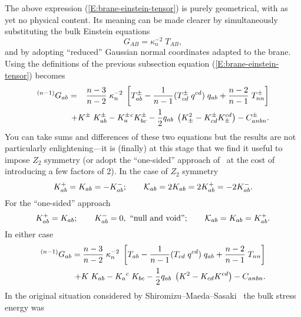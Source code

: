 \documentclass[a4paper,10pt]{article}
\begin{document}
{The above expression (\ref{E:brane-einstein-tensor}) is purely geometrical,
with as yet no physical content. Its meaning can be made clearer by
simultaneously substituting the bulk Einstein equations
%
\begin{equation}
G_{AB} = \kappa_n^{-2} \; T_{AB},
\end{equation}
%
and by adopting ``reduced'' Gaussian normal coordinates adapted to the
brane.  Using the definitions of the previous subsection equation
(\ref{E:brane-einstein-tensor}) becomes
% 
\begin{eqnarray}
{}^{(n-1)}G_{ab}=
&&\hspace{-6mm}
{n-3\over n-2}\; \kappa_n^{-2} \; \left[
T_{ab}^\pm - {1\over n-1} (T_{cd}^\pm \; q^{cd}) \; q_{ab} 
+ {n-2\over n-1} \; T_{nn}^\pm
\right]
\nonumber \\
&&\hspace{-6mm}
+K^\pm \; K_{ab}^\pm-K^\pm_{a}{}^{c} K^\pm_{bc} - {1 \over 2}  
q_{ab}\; \left( K_\pm^2- K^\pm_{cd} K_\pm^{cd}\right) - C^\pm_{anbn}.
\label{E:brane-einstein-tensor-2}
\end{eqnarray}
% 
You can take sums and differences of these two equations but the
results are not particularly enlightening---it is (finally) at this
stage that we find it useful to impose $Z_2$ symmetry (or adopt the
``one-sided'' approach of~\cite{void,edge} at the cost of introducing
a few factors of 2). In the case of $Z_2$ symmetry
%
\begin{equation}
K^+_{ab} = K_{ab} = - K^-_{ab}; \qquad {\mathcal K}_{ab} = 2 K_{ab} = 2 K^+_{ab} = -2 K^-_{ab}.
\end{equation}
%
For the ``one-sided'' approach~\cite{void,edge}
%
\begin{equation}
K^+_{ab} =  K_{ab}; \qquad 
K^-_{ab} = 0, \hbox{ ``null and void''}; \qquad 
{\mathcal K}_{ab} = K_{ab} = K^+_{ab}.
\end{equation}
%
In either case
% 
\begin{eqnarray}
{}^{(n-1)}G_{ab}=
&&\hspace{-6mm}
{n-3\over n-2}\; \kappa_n^{-2} \; \left[
T_{ab} - {1\over n-1} (T_{cd} \; q^{cd}) \; q_{ab} 
+ {n-2\over n-1} \; T_{nn}
\right]
\nonumber \\
&&\hspace{-6mm}
+K \; K_{ab}-K_{a}{}^{c} \; K_{bc} 
- {1 \over 2}  
q_{ab}\; \left( K^2- K_{cd} K^{cd}\right) 
- C_{anbn}.
\label{E:brane-einstein-tensor-3}
\end{eqnarray}
% 
In the original situation considered by
Shiromizu--Maeda--Sasaki~\cite{Shiromizu} the bulk stress energy was
}
\end{document}

